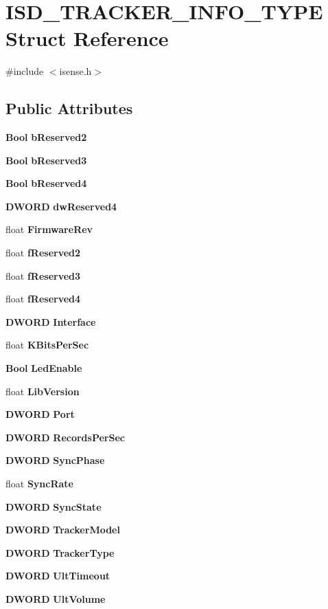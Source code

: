 \section{\-I\-S\-D\-\_\-\-T\-R\-A\-C\-K\-E\-R\-\_\-\-I\-N\-F\-O\-\_\-\-T\-Y\-P\-E \-Struct \-Reference}
\label{structISD__TRACKER__INFO__TYPE}


{\ttfamily \#include $<$isense.\-h$>$}

\subsection*{\-Public \-Attributes}
\begin{DoxyCompactItemize}
\item 
{\bf \-Bool} {\bf b\-Reserved2}
\item 
{\bf \-Bool} {\bf b\-Reserved3}
\item 
{\bf \-Bool} {\bf b\-Reserved4}
\item 
{\bf \-D\-W\-O\-R\-D} {\bf dw\-Reserved4}
\item 
float {\bf \-Firmware\-Rev}
\item 
float {\bf f\-Reserved2}
\item 
float {\bf f\-Reserved3}
\item 
float {\bf f\-Reserved4}
\item 
{\bf \-D\-W\-O\-R\-D} {\bf \-Interface}
\item 
float {\bf \-K\-Bits\-Per\-Sec}
\item 
{\bf \-Bool} {\bf \-Led\-Enable}
\item 
float {\bf \-Lib\-Version}
\item 
{\bf \-D\-W\-O\-R\-D} {\bf \-Port}
\item 
{\bf \-D\-W\-O\-R\-D} {\bf \-Records\-Per\-Sec}
\item 
{\bf \-D\-W\-O\-R\-D} {\bf \-Sync\-Phase}
\item 
float {\bf \-Sync\-Rate}
\item 
{\bf \-D\-W\-O\-R\-D} {\bf \-Sync\-State}
\item 
{\bf \-D\-W\-O\-R\-D} {\bf \-Tracker\-Model}
\item 
{\bf \-D\-W\-O\-R\-D} {\bf \-Tracker\-Type}
\item 
{\bf \-D\-W\-O\-R\-D} {\bf \-Ult\-Timeout}
\item 
{\bf \-D\-W\-O\-R\-D} {\bf \-Ult\-Volume}
\end{DoxyCompactItemize}


